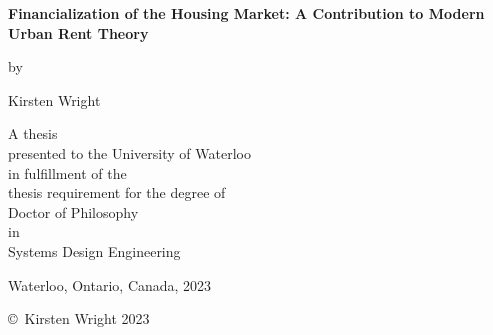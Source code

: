 \pagestyle{empty}

\begin{titlepage}
        \begin{center}
        \vspace*{1.0cm}

        \Huge
        {\bf Financialization of the Housing Market: A Contribution to Modern Urban Rent Theory}

        \vspace*{1.0cm}

        \normalsize
        by \\

        \vspace*{1.0cm}

        \Large
        Kirsten Wright \\

        \vspace*{3.0cm}

        \normalsize
        A thesis \\
        presented to the University of Waterloo \\ 
        in fulfillment of the \\
        thesis requirement for the degree of \\
        Doctor of Philosophy \\
        in \\
        Systems Design Engineering \\

        \vspace*{2.0cm}

        Waterloo, Ontario, Canada, 2023 \\

        \vspace*{1.0cm}

        \copyright\ Kirsten Wright 2023 \\
        \end{center}
\end{titlepage}

\pagestyle{plain}
\setcounter{page}{2}

\cleardoublepage %
 
